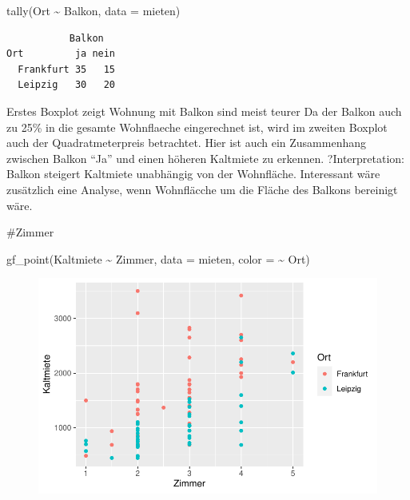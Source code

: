\documentclass[
  a4paper,
  DIV=11]{scrartcl}
\newenvironment{Shaded}{\begin{snugshade}}{\end{snugshade}}
\newcommand{\AttributeTok}[1]{\textcolor[rgb]{0.40,0.45,0.13}{#1}}
\newcommand{\FunctionTok}[1]{\textcolor[rgb]{0.28,0.35,0.67}{#1}}
\newcommand{\NormalTok}[1]{\textcolor[rgb]{0.00,0.23,0.31}{#1}}
\newcommand{\SpecialCharTok}[1]{\textcolor[rgb]{0.37,0.37,0.37}{#1}}
\begin{document}
\begin{Shaded}
\begin{Highlighting}[]
\FunctionTok{tally}\NormalTok{(Ort }\SpecialCharTok{\textasciitilde{}}\NormalTok{ Balkon, }\AttributeTok{data =}\NormalTok{ mieten)}
\end{Highlighting}
\end{Shaded}

\begin{verbatim}
           Balkon
Ort         ja nein
  Frankfurt 35   15
  Leipzig   30   20
\end{verbatim}

Erstes Boxplot zeigt Wohnung mit Balkon sind meist teurer Da der Balkon
auch zu 25\% in die gesamte Wohnflaeche eingerechnet ist, wird im
zweiten Boxplot auch der Quadratmeterpreis betrachtet. Hier ist auch ein
Zusammenhang zwischen Balkon ``Ja'' und einen höheren Kaltmiete zu
erkennen. ?Interpretation: Balkon steigert Kaltmiete unabhängig von der
Wohnfläche. Interessant wäre zusätzlich eine Analyse, wenn Wohnfläcche
um die Fläche des Balkons bereinigt wäre.

\#Zimmer

\begin{Shaded}
\begin{Highlighting}[]
\FunctionTok{gf\_point}\NormalTok{(Kaltmiete }\SpecialCharTok{\textasciitilde{}}\NormalTok{ Zimmer, }\AttributeTok{data =}\NormalTok{ mieten, }\AttributeTok{color =} \SpecialCharTok{\textasciitilde{}}\NormalTok{ Ort)}
\end{Highlighting}
\end{Shaded}

\begin{figure}[H]

{\centering \includegraphics{Mietmodellierung_files/figure-pdf/unnamed-chunk-14-1.pdf}

}

\end{figure}
\end{document}
